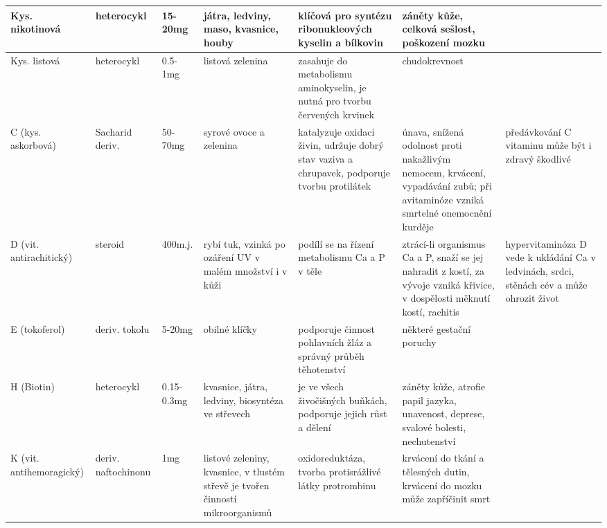 \begin{landscape}
\begin{longtable}{| m{7em} | m{5em} | m{5em} | m{8em}<{\RaggedRight} | m{15em}<{\RaggedRight} | m{15em}<{\RaggedRight} | m{10em}<{\RaggedRight} |}
    \endfirsthead
        \hline
        Kys. nikotinová & heterocykl & 15-20mg & játra, ledviny, maso, kvasnice, houby & klíčová pro syntézu ribonukleových kyselin a bílkovin & záněty kůže, celková sešlost, poškození mozku& \\
        \hline
        Kys. listová & heterocykl & 0.5-1mg & listová zelenina & zasahuje do metabolismu aminokyselin, je nutná pro tvorbu červených krvinek & chudokrevnost & \\
        \hline
        C (kys. askorbová) & Sacharid deriv. & 50-70mg & syrové ovoce a zelenina & katalyzuje oxidaci živin, udržuje dobrý stav vaziva a chrupavek, podporuje tvorbu protilátek & únava, snížená odolnost proti nakažlivým nemocem, krvácení, vypadávání zubů; při avitaminóze vzniká smrtelné onemocnění kurděje & předávkování C vitaminu může být i zdravý škodlivé \\
        \hline
        D (vit. antirachitický) & steroid & 400m.j. & rybí tuk, vzinká po ozáření UV v malém množství i v kůži & podílí se na řízení metabolismu Ca a P v těle & ztrácí-li organismus Ca a P, snaží se jej nahradit z kostí, za vývoje vzniká křivice, v dospělosti měknutí kostí, rachitis & hypervitaminóza D vede k ukládání Ca v ledvinách, srdci, stěnách cév a může ohrozit život \\
        \hline
        E (tokoferol) & deriv. tokolu & 5-20mg & obilné klíčky & podporuje činnost pohlavních žláz a správný průběh těhotenství & některé gestační poruchy & \\
        \hline
        H (Biotin) & heterocykl & 0.15-0.3mg & kvasnice, játra, ledviny, biosyntéza ve střevech & je ve všech živočišných buňkách, podporuje jejich růst a dělení & záněty kůže, atrofie papil jazyka, unavenost, deprese, svalové bolesti, nechutenství & \\
        \hline
        K (vit. antihemoragický) & deriv. naftochinonu & 1mg & listové zeleniny, kvasnice, v tlustém střevě je tvořen činností mikroorganismů & oxidoreduktáza, tvorba protisrážlivé látky protrombinu & krvácení do tkání a tělesných dutin, krvácení do mozku může zapříčinit smrt & \\
        \hline
    \end{longtable}
\end{landscape}
